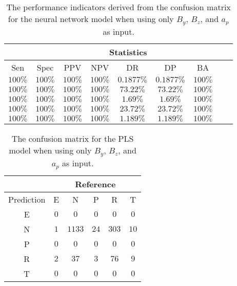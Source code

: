 \begin{table}[!ht]
	\centering
	\begin{tabular}{|c|c|c|c|c|c|c|c|c|}
		\hline
		 & \multicolumn{7}{c|}{Statistics} \\ \hline
		Sen & Spec & PPV & NPV & DR & DP & BA \\ \hline
		$100\%$ & $100\%$ & $100\%$ & $100\%$ & $0.1877\%$ & $0.1877\%$ & $100\%$ \\ \hline
		$100\%$ & $100\%$ & $100\%$ & $100\%$ & $73.22\%$ & $73.22\%$ & $100\%$ \\ \hline
		$100\%$ & $100\%$ & $100\%$ & $100\%$ & $1.69\%$ & $1.69\%$ & $100\%$ \\ \hline
		$100\%$ & $100\%$ & $100\%$ & $100\%$ & $23.72\%$ & $23.72\%$ & $100\%$ \\ \hline
		$100\%$ & $100\%$ & $100\%$ & $100\%$ & $1.189\%$ & $1.189\%$ & $100\%$ \\ \hline
	\end{tabular}
	\caption{The performance indicators derived from the confusion matrix for the neural network model when using only $B_{y}$, $B_{z}$, and $a_{p}$ as input.}
	\label{tab:cs:yzap:nnet}
\end{table}

\begin{table}[!ht]
	\centering
	\begin{tabular}{|c|c|c|c|c|c|}
		\hline
		 & \multicolumn{5}{|c|}{Reference} \\ \hline
		 Prediction & E & N & P & R & T \\ \hline
		 E & $0$ & $0$ & $0$ & $0$ & $0$ \\ \hline
		 N & $1$ & $1133$ & $24$ & $303$ & $10$ \\ \hline
		 P & $0$ & $0$ & $0$ & $0$ & $0$ \\ \hline
		 R & $2$ & $37$ & $3$ & $76$ & $9$ \\ \hline
		 T & $0$ & $0$ & $0$ & $0$ & $0$ \\ \hline
	\end{tabular}
	\caption{The confusion matrix for the PLS model when using only $B_{y}$, $B_{z}$, and $a_{p}$ as input.}
	\label{tab:cm:yzap:pls}
\end{table}

